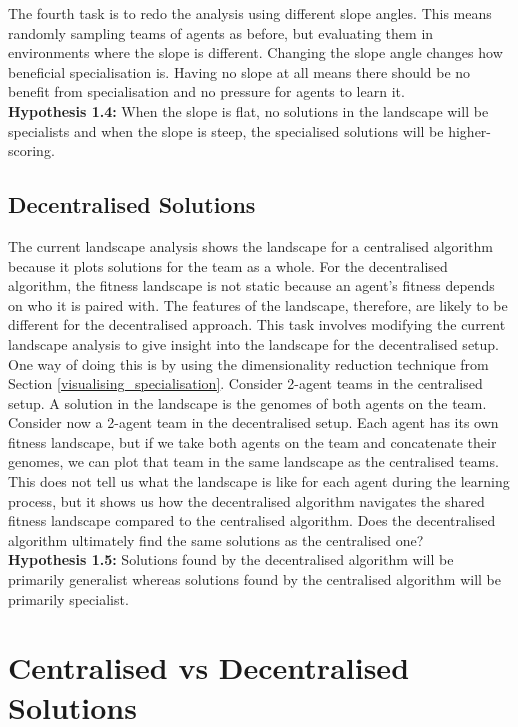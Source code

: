 \documentclass[12pt]{article}
\begin{document}
The fourth task is to redo the analysis using different slope angles. 
This means randomly sampling teams of agents as before, but evaluating them in environments where the slope is different. 
Changing the slope angle changes how beneficial specialisation is. 
Having no slope at all means there should be no benefit from specialisation and no pressure for agents to learn it.\\

\textbf{Hypothesis 1.4:} When the slope is flat, no solutions in the landscape will be specialists and when the slope is steep, the specialised solutions will be higher-scoring.\\

\subsection{Decentralised Solutions} 

The current landscape analysis shows the landscape for a centralised algorithm because it plots solutions for the team as a whole. 
For the decentralised algorithm, the fitness landscape is not static because an agent’s fitness depends on who it is paired with. 
The features of the landscape, therefore, are likely to be different for the decentralised approach. 
This task involves modifying the current landscape analysis to give insight into the landscape for the decentralised setup.
One way of doing this is by using the dimensionality reduction technique from Section \ref{visualising_specialisation}.
Consider 2-agent teams in the centralised setup.
A solution in the landscape is the genomes of both agents on the team.
Consider now a 2-agent team in the decentralised setup.
Each agent has its own fitness landscape, but if we take both agents on the team and concatenate their genomes, we can plot that team in the same landscape as the centralised teams.
This does not tell us what the landscape is like for each agent during the learning process, but it shows us how the decentralised algorithm navigates the shared fitness landscape compared to the centralised algorithm.
Does the decentralised algorithm ultimately find the same solutions as the centralised one?\\

\textbf{Hypothesis 1.5:} Solutions found by the decentralised algorithm will be primarily generalist whereas solutions found by the centralised algorithm will be primarily specialist.\\

\section{Centralised vs Decentralised Solutions}\label{centralised_vs_decentralised}
\end{document}
